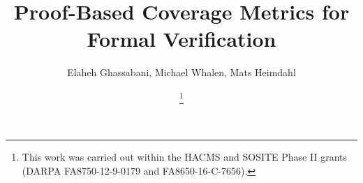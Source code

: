 \documentclass[10pt, conference]{IEEEtran}
\begin{document}
\newcommand{\mike}[1]{\textcolor{red}{#1}}
\newcommand{\fixed}[1]{\textcolor{purple}{#1}}
\newcommand{\andrew}[1]{\textcolor{green}{#1}}
\newcommand{\ela}[1]{\textcolor{blue}{#1}}
\newcommand{\stateequiv}{\equiv_{s}}
\newcommand{\traceequiv}{\equiv_{\sigma}}
\newcommand{\ta}{\text{TA}}
\newcommand{\cta}{\text{TA$_{C}$}}
\newcommand{\tta}{\text{TA$_{T}$}}

\newcommand{\bfalg}{{\small {IVC\_BF}}\xspace}
\newcommand{\ucalg}{{\small {IVC\_UC}}\xspace}
\newcommand{\ucbfalg}{{\small {IVC\_UCBF}}\xspace}
\newcommand{\mustalg}{{\small {IVC\_MUST}}\xspace}

\newtheorem{definition}{Definition}
\newtheorem{lemma}{Lemma}
\newtheorem{theorem}{Theorem}
\newtheorem{coroll}{Corollary}
\newtheorem{note}{Note}
%
\title{Proof-Based Coverage Metrics for Formal Verification}


\author{\IEEEauthorblockN
{
Elaheh Ghassabani, Michael Whalen, Mats Heimdahl
}
\and
{}
\thanks{This work was carried out within the HACMS and SOSITE Phase II grants (DARPA FA8750-12-9-0179 and FA8650-16-C-7656).}
}

\end{document}
